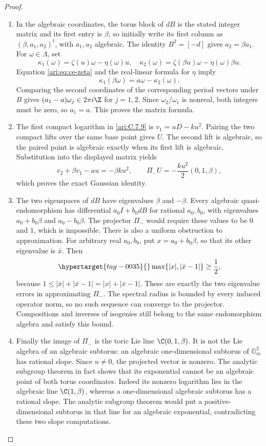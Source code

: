 \begin{proof}
\begin{enumerate}[label=\arabic*.,leftmargin=*]
\item In the algebraic coordinates, the torus block of $dB$ is the stated integer matrix and its first entry is
$\beta$, so initially write its first column as
$(\beta,a_1,a_2)^t$, with $a_1,a_2$ algebraic.
The identity $B^2=[-d]$ gives $a_2=\beta a_1$.
For $\omega\in\Lambda$, set
\[
 \kappa_1(\omega)=\zeta(u)\omega-\eta(\omega)u,
 \quad
 \kappa_2(\omega)=\zeta(\beta u)\omega-\eta(\omega)\beta u.
\]
Equation \eqref{ari:eq:ce-zeta} and the real-linear formula for
$\eta$ imply
\[
 \kappa_1(\beta\omega)=a\omega-\kappa_2(\omega).
\]
Comparing the second coordinates of the corresponding period
vectors under $B$ gives
$(a_1-a)\omega_j\in2\pi i\Z$ for $j=1,2$.
Since $\omega_2/\omega_1$ is nonreal, both integers must
be zero, so $a_1=a$. This proves the matrix formula.

\item The first compact logarithm in \ref{ari:C.7.9} is
$v_1=uD-ku^2$. Pairing the two compact lifts over the same base
point gives $U$. The second lift
is algebraic, so the paired point is algebraic exactly when its
first lift is algebraic.
Substitution into the displayed matrix yields
\[
 v_2+\beta v_1-au=-\beta ku^2,
 \qquad
 \Pi_-U=-\frac{ku^2}{2}(0,1,\beta),
\]
which proves the exact Gaussian identity.

\item The two eigenspaces of $dB$ have eigenvalues $\beta$ and
$-\beta$. Every algebraic quasi-endomorphism has differential
$a_0I+b_0dB$ for rational $a_0,b_0$, with eigenvalues
$a_0+b_0\beta$ and $a_0-b_0\beta$. The projector
$\Pi_-$ would require these values to be $0$ and $1$,
which is impossible. There is also a uniform obstruction to
approximation. For arbitrary real $a_0,b_0$, put
$x=a_0+b_0\beta$, so that its other eigenvalue is
$\bar x$. Then
\begin{equation}\hypertarget{tag-0035}{}\label{ari:eq:ce-gap}
 \max\{|x|,|\bar x-1|\}\ge\frac12,
\end{equation}
because $1\le|\bar x|+|\bar x-1|=|x|+|\bar x-1|$.
These are exactly the two eigenvalue errors in approximating
$\Pi_-$. The spectral radius is bounded by every induced
operator norm, so no such sequence can converge to the
projector. Compositions and inverses of isogenies still belong
to the same endomorphism algebra and satisfy this bound.

\item Finally the image of $\Pi_-$ is the toric Lie line
$\C(0,1,\beta)$. It is not the Lie algebra of an algebraic
subtorus: an algebraic one-dimensional subtorus of
$\mathbb G_m^2$ has rational slope. Since $u\ne0$,
the projected vector is nonzero. The analytic subgroup
theorem in fact shows that its exponential cannot be an
algebraic point of both torus coordinates. Indeed its nonzero logarithm lies in the algebraic line
$\C(1,\beta)$, whereas a one-dimensional algebraic subtorus
has a rational slope. The analytic subgroup theorem would put
a positive-dimensional subtorus in that line for an algebraic
exponential, contradicting these two slope computations.


\end{enumerate}
\end{proof}
